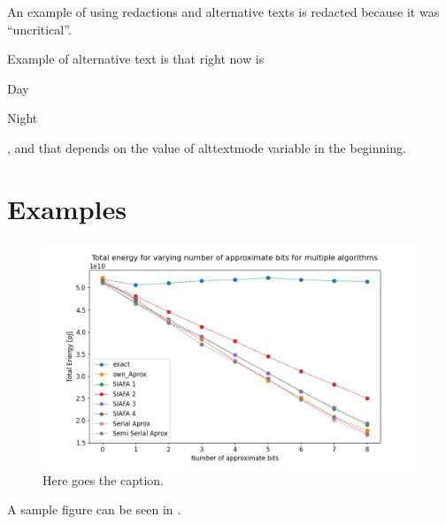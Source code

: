 \documentclass[]{IEEEtran}
\begin{document}

An example of using redactions and alternative texts is redacted because it was ``uncritical''.


\begin{Uncritical}
Example of alternative text is that right now is
\begin{TextA}
Day
\end{TextA}
\begin{TextB}
Night
\end{TextB}
, and that depends on the value of alttextmode variable in the beginning.
\end{Uncritical}

\section{Examples}

\begin{figure}[!bth] %
\centering
\includegraphics[width=0.96\columnwidth]{sample}
\caption{Here goes the caption.}
\label{fig_sample}
\end{figure}
A sample figure can be seen in .
\end{document}
